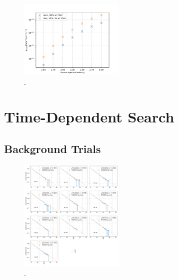 \begin{figure}
    \centering
    \includegraphics[width=5cm]{Plots/05_csky/time_int_sens_gfu_gold_9_years_new.pdf}
    \caption{.}
\end{figure}

\chapter{Time-Dependent Search}

\section{Background Trials}

\begin{figure}
    \centering
    \includegraphics[width=5cm]{Plots/05_csky/9_years_gfu_gold_time_dep_bg_t0.pdf}
    \caption{.}
\end{figure}

